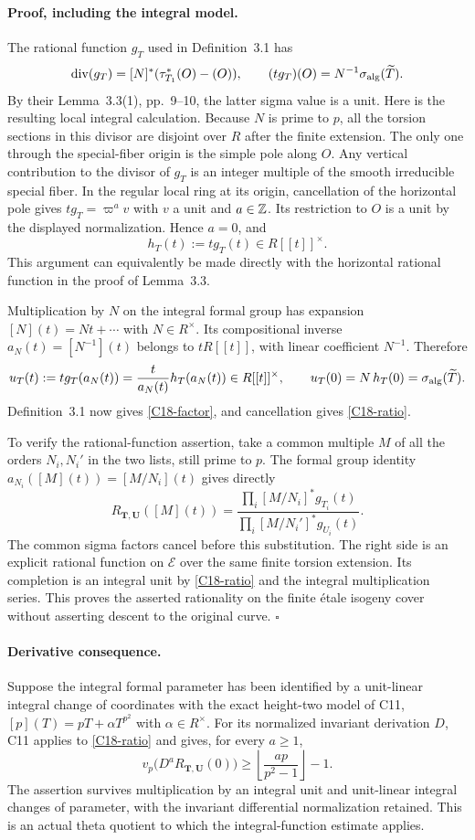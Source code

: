 \documentclass[11pt]{article}
\theoremstyle{definition}\newtheorem{definition}[theorem]{Definition}\newtheorem{remark}[theorem]{Remark}
\begin{document}
\paragraph{Proof, including the integral model.}
The rational function $g_T$ used in Definition~3.1 has
\[
 \operatorname{div}(g_T)=[N]^*(\tau_{T_1}^*(O)-(O)),\qquad
 (t g_T)(O)=N^{-1}\sigma_{\rm alg}(\widetilde T).
\]
By their Lemma~3.3(1), pp.~9--10, the latter sigma value is a
unit. Here is the resulting local integral calculation.
Because $N$ is prime to $p$, all the torsion sections in this
divisor are disjoint over $R$ after the finite extension. The
only one through the special-fiber origin is the simple pole
along $O$. Any vertical contribution to the divisor of $g_T$
is an integer multiple of the smooth irreducible special fiber.
In the regular local ring at its origin, cancellation of the
horizontal pole gives $t g_T=\varpi^a v$ with $v$ a unit and
$a\in\mathbb Z$. Its restriction to $O$ is a unit by the displayed
normalization. Hence $a=0$, and
\[
 h_T(t):=t g_T(t)\in R[[t]]^\times.
\]
This argument can equivalently be made directly with the
horizontal rational function in the proof of Lemma~3.3.

Multiplication by $N$ on the integral formal group has expansion
$[N](t)=Nt+\cdots$ with $N\in R^\times$. Its compositional inverse
$a_N(t)=[N^{-1}](t)$ belongs to $tR[[t]]$, with linear coefficient
$N^{-1}$. Therefore
\[
 u_T(t):=t g_T(a_N(t))
       =\frac{t}{a_N(t)}h_T(a_N(t))\in R[[t]]^\times,
 \qquad u_T(0)=N\,h_T(0)=\sigma_{\rm alg}(\widetilde T).
\]
Definition~3.1 now gives \eqref{C18-factor}, and cancellation
gives \eqref{C18-ratio}.

To verify the rational-function assertion, take a common multiple
$M$ of all the orders $N_i,N_i'$ in the two lists, still prime
to $p$. The formal group identity
$a_{N_i}([M](t))=[M/N_i](t)$ gives directly
\[
 R_{\mathbf T,\mathbf U}([M](t))=
 \frac{\prod_i[M/N_i]^*g_{T_i}(t)}
      {\prod_i[M/N_i']^*g_{U_i}(t)}.
\]
The common sigma factors cancel before this substitution.
The right side is an explicit rational function on $\mathcal E$
over the same finite torsion extension. Its completion is an
integral unit by \eqref{C18-ratio} and the integral multiplication
series. This proves the asserted rationality on the finite \'etale
isogeny cover without asserting descent to the original curve.
\hfill$\square$

\paragraph{Derivative consequence.}
Suppose the integral formal parameter has been identified by a
unit-linear integral change of coordinates with the exact height-two
model of C11, $[p](T)=pT+\alpha T^{p^2}$ with $\alpha\in R^\times$.
For its normalized invariant derivation $D$, C11 applies to
\eqref{C18-ratio} and gives, for every $a\geq1$,
\[
 v_p\bigl(D^a R_{\mathbf T,\mathbf U}(0)\bigr)
       \geq\left\lfloor\frac{ap}{p^2-1}\right\rfloor-1.
\]
The assertion survives multiplication by an integral unit and
unit-linear integral changes of parameter, with the invariant
differential normalization retained. This is an actual theta
quotient to which the integral-function estimate applies.
\end{document}
